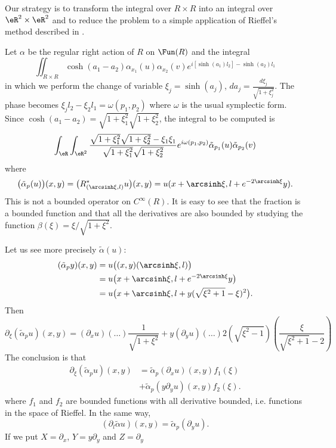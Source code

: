 Our strategy is to transform the integral over $R\times R$ into an integral over $\eR^2\times\eR^2$ and to reduce the problem to a simple application of Rieffel's method described in \cite{Rieffel}. 

Let $\alpha$ be the regular right action of $R$ on $\Fun(R)$ and the integral
\begin{equation}
\iint_{R\times R}\cosh(a_1-a_2)\alpha_{x_1}(u)\alpha_{x_2}(v)e^{i[\sinh(a_1)l_2]-\sinh(a_2)l_1}
\end{equation}
in which we perform the change of variable $\xi_j=\sinh(a_j)$, $da_j=\frac{ d\xi_j }{ \sqrt{1+\xi_j^2} }$. The phase becomes $\xi_jl_2-\xi_2l_1=\omega(p_1,p_2)$ where $\omega$ is the usual symplectic form. Since $\cosh(a_1-a_2)=\sqrt{1+\xi_1^2}\sqrt{1+\xi_2^2}$, the integral to be computed  is
\[ 
  \int_{\eR}\int_{\eR^2}\frac{ \sqrt{1+\xi_1^2}\sqrt{1+\xi_2^2}-\xi_1\xi_1  }{ \sqrt{1+\xi_1^2} \sqrt{1+\xi_2^2}  }e^{i\omega(p_1,p_2)} \tilde\alpha_{p_1}(u)\tilde\alpha_{p_2}(v)
\]
where 
\begin{equation} 
  \big( \tilde\alpha_p(u) \big)(x,y)=\big( R^*_{(\arcsinh\xi,l)}u \big)(x,y)=u( x+\arcsinh\xi,l+e^{-2\arcsinh\xi}y ).
\end{equation}
This is not a bounded operator on $ C^{\infty}(R)$.
It is easy to see that the fraction is a bounded function and that all the derivatives are also bounded by studying the function $\beta(\xi)=\xi/\sqrt{1+\xi^2}$.

Let us see more precisely $\tilde\alpha(u)$:
\begin{equation}
\begin{split}
(\tilde\alpha_py)(x,y)&=u\big( (x,y)(\arcsinh\xi,l) \big)\\
		&=u\big( x+\arcsinh\xi,l+e^{-2\arcsinh\xi}y \big)\\
		&=u\big( x+\arcsinh\xi,l+y(\sqrt{\xi^2+1}-\xi)^2 \big).
\end{split}
\end{equation}
Then 
\begin{equation}
\partial_{\xi}(\tilde\alpha_pu)(x,y)=(\partial_xu)(\ldots)\frac{1}{ \sqrt{ 1+\xi^2 }}+y(\partial_yu)(\ldots)2(\sqrt{\xi^2-1})(\frac{ \xi }{ \sqrt{\xi^2+1}-2 })
\end{equation}
The conclusion is that
\begin{equation}
\begin{split}
\partial_{\xi}(\tilde\alpha_pu)(x,y)&=\tilde\alpha_p(\partial_xu)(x,y)f_1(\xi)\\
		&+\tilde\alpha_p(y\partial_yu)(x,y)f_2(\xi).
  \end{split}
\end{equation}
where $f_1$ and $f_2$ are bounded functions with all derivative bounded, i.e. functions in the space of Rieffel. In the same way,
\begin{equation}
(\partial_l\tilde\alpha u)(x,y)=\tilde\alpha_p(\partial_yu).
\end{equation}
If we put $X=\partial_x$, $Y=y\partial_y$ and $Z=\partial_y$

